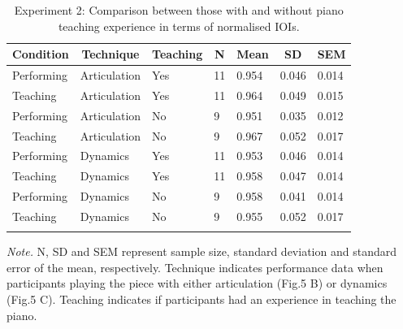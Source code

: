 \documentclass[
  man,floatsintext]{apa6}
\begin{document}
\begin{table}[tbp]

\begin{center}
\begin{threeparttable}

\caption{\label{tab:ioi-teaching-desc-2}Experiment 2: Comparison between those with and without piano teaching experience in terms of normalised IOIs.}

\begin{tabular}{lllllll}
\toprule
Condition & \multicolumn{1}{c}{Technique} & \multicolumn{1}{c}{Teaching} & \multicolumn{1}{c}{N} & \multicolumn{1}{c}{Mean} & \multicolumn{1}{c}{SD} & \multicolumn{1}{c}{SEM}\\
\midrule
Performing & Articulation & Yes & 11 & 0.954 & 0.046 & 0.014\\
Teaching & Articulation & Yes & 11 & 0.964 & 0.049 & 0.015\\
Performing & Articulation & No & 9 & 0.951 & 0.035 & 0.012\\
Teaching & Articulation & No & 9 & 0.967 & 0.052 & 0.017\\
Performing & Dynamics & Yes & 11 & 0.953 & 0.046 & 0.014\\
Teaching & Dynamics & Yes & 11 & 0.958 & 0.047 & 0.014\\
Performing & Dynamics & No & 9 & 0.958 & 0.041 & 0.014\\
Teaching & Dynamics & No & 9 & 0.955 & 0.052 & 0.017\\
\bottomrule
\addlinespace
\end{tabular}

\begin{tablenotes}[para]
\normalsize{\textit{Note.} N, SD and SEM represent sample size, standard deviation and standard error of the mean, respectively. Technique indicates performance data when participants playing the piece with either articulation (Fig.5 B) or dynamics (Fig.5 C). Teaching indicates if participants had an experience in teaching the piano.}
\end{tablenotes}

\end{threeparttable}
\end{center}

\end{table}
\end{document}
